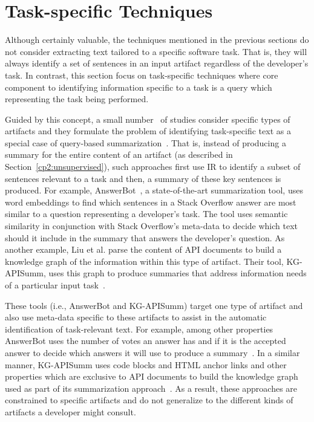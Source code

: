 



\section{Task-specific Techniques}
\label{cp2:task-approaches}



Although certainly valuable, the techniques mentioned in the previous sections
do not consider extracting text tailored to 
a specific software task. That is, they will always identify 
a set of sentences in an input artifact regardless of the developer's task. 
In contrast, this section focus on task-specific techniques
where core component to identifying information specific to a task 
is a query which representing the task being performed. 


Guided by this concept, 
a small number~\cite{Xu2017, silva2019, liu2019qapi} of studies consider specific types of artifacts and
they formulate the problem of identifying task-specific text as 
a special case of query-based summarization~\cite{Goldsteinet1999}.
That is, instead of producing a summary for the entire content of 
an artifact (as described in Section~\ref{cp2:unsupervised}),
such approaches first use \acs{IR} to identify a subset 
of sentences relevant to a task and then, 
a summary of these key sentences is produced.
For example, AnswerBot~\cite{Xu2017}, a state-of-the-art summarization tool, 
uses word embeddings to find which sentences in a Stack Overflow answer 
are most similar to a question  representing a developer's task.
The tool uses semantic similarity in conjunction with 
Stack Overflow's meta-data to decide which text should it include
in the summary that answers the developer's question. 
As another example, Liu et al. parse the content 
of API documents to build a knowledge graph 
of the information within this type of artifact. 
Their tool, KG-APISumm, uses this graph 
to produce summaries that address information needs 
of a particular input task~\cite{liu2019qapi}. 



These tools (i.e., AnswerBot and KG-APISumm)
target one type of artifact and also use meta-data specific to these artifacts to 
assist in the automatic identification of task-relevant text. 
For example, among other properties AnswerBot uses the number of votes an answer has and if it is the accepted answer to decide which answers it will use to produce a summary~\cite{Xu2017}. 
In a similar manner, KG-APISumm uses 
code blocks and HTML anchor links and other properties which are exclusive to API documents to build the knowledge graph used as part of its summarization approach~\cite{liu2019qapi}.
As a result, these approaches are constrained to specific artifacts and do not 
generalize to the different kinds of artifacts a developer might consult. 


